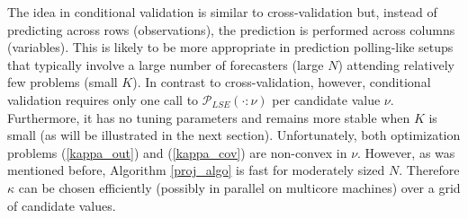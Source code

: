 \documentclass[11pt]{article}
\theoremstyle{definition}
\theoremstyle{definition}
\def\bSigma{{\bf \Sigma}}
\begin{document}
The idea in conditional validation is similar to cross-validation but, instead of predicting across rows (observations), the prediction is  performed across columns (variables).  This is likely to be more appropriate in prediction polling-like setups that typically involve a large number of forecasters (large $N$) attending relatively few problems (small $K$). In contrast to cross-validation, however, conditional validation requires only one call to $\mathcal{P}_{LSE}( \cdot : \nu)$ per candidate value $\nu$. Furthermore, it has no tuning parameters and remains more stable when $K$ is small (as will be illustrated in the next section).
Unfortunately, both optimization problems (\ref{kappa_out}) and (\ref{kappa_cov}) are non-convex in $\nu$.  However, as was mentioned before, Algorithm \ref{proj_algo} is fast for moderately sized $N$. Therefore $\kappa$ can be chosen efficiently (possibly in parallel on multicore machines) over a  grid of candidate values. 



%
 











\end{document}
